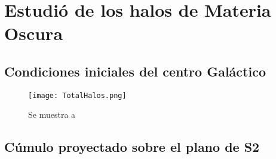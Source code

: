 
\chapter{Estudió de los halos de Materia Oscura}
\setcounter{equation}{0}



\section{Condiciones iniciales del centro Galáctico}
\begin{figure}[H]
    \centering
    \texttt{[image: TotalHalos.png]}
    \label{9}
    \caption[Evolución del Número de halos]{Se muestra a}
\end{figure}


\section{Cúmulo proyectado sobre el plano de S2}


